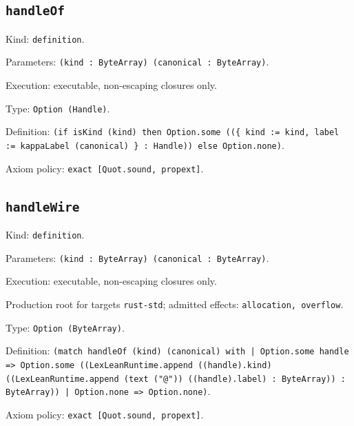 \documentclass[11pt]{article}
\begin{document}
\subsection*{\texttt{handleOf}}
\noindent Kind: \texttt{definition}.\par
\noindent Parameters: \texttt{(kind : ByteArray) (canonical : ByteArray)}.\par
\noindent Execution: executable, non-escaping closures only.\par
\noindent Type: \texttt{Option (Handle)}.\par
\noindent Definition: \texttt{(if isKind (kind) then Option.some ((\{ kind := kind, label := kappaLabel (canonical) \} : Handle)) else Option.none)}.\par
\noindent Axiom policy: \texttt{exact [Quot.sound, propext]}.\par
\subsection*{\texttt{handleWire}}
\noindent Kind: \texttt{definition}.\par
\noindent Parameters: \texttt{(kind : ByteArray) (canonical : ByteArray)}.\par
\noindent Execution: executable, non-escaping closures only.\par
\noindent Production root for targets \texttt{rust-std}; admitted effects: \texttt{allocation, overflow}.\par
\noindent Type: \texttt{Option (ByteArray)}.\par
\noindent Definition: \texttt{(match handleOf (kind) (canonical) with | Option.some handle => Option.some ((LexLeanRuntime.append ((handle).kind) ((LexLeanRuntime.append (text ("@")) ((handle).label) : ByteArray)) : ByteArray)) | Option.none => Option.none)}.\par
\noindent Axiom policy: \texttt{exact [Quot.sound, propext]}.\par
\end{document}
